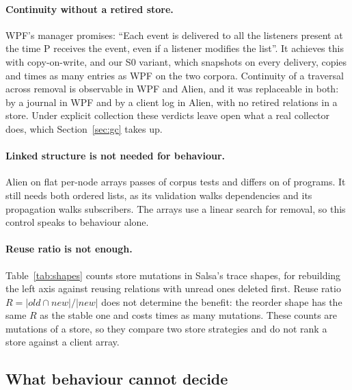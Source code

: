\documentclass[11pt]{article}
\begin{document}
\paragraph{Continuity without a retired store.} WPF's manager promises: ``Each event is delivered to all the listeners present at the time P receives the event, even if a listener modifies the list''. It achieves this with copy-on-write, and our S0 variant, which snapshots on every delivery, copies \wpfSnapshotFactorA{} and \wpfSnapshotFactorB{} times as many entries as WPF on the two corpora. Continuity of a traversal across removal is observable in WPF and Alien, and it was replaceable in both: by a journal in WPF and by a client log in Alien, with no retired relations in a store. Under explicit collection these verdicts leave open what a real collector does, which Section~\ref{sec:gc} takes up.

\paragraph{Linked structure is not needed for behaviour.} Alien on flat per-node arrays passes \alienFlatPassed{} of \alienCorpus{} corpus tests and differs on \alienFlatFrozen{} of \alienPrograms{} programs. It still needs both ordered lists, as its validation walks dependencies and its propagation walks subscribers. The arrays use a linear search for removal, so this control speaks to behaviour alone.

\paragraph{Reuse ratio is not enough.} Table~\ref{tab:shapes} counts store mutations in Salsa's trace shapes, for rebuilding the left axis against reusing relations with unread ones deleted first. Reuse ratio $R = |\mathit{old} \cap \mathit{new}| / |\mathit{new}|$ does not determine the benefit: the reorder shape has the same $R$ as the stable one and costs \reorderOverStable{} times as many mutations. These counts are mutations of a store, so they compare two store strategies and do not rank a store against a client array.

\begin{table}[tbp]
\centering
\footnotesize

\caption{Store mutations (relates, unlinks and moves) per Salsa trace shape. Each program has 21 executions.}
\label{tab:shapes}
\end{table}

\subsection{What behaviour cannot decide}
\end{document}
